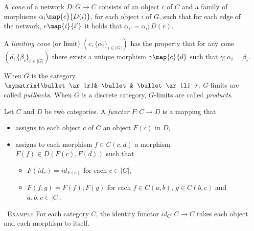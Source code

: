 \documentclass[10pt, a4paper]{isov2}
\renewenvironment{example}[0]{\ \newline \textsc{Example}\quad }{}
\begin{document}
\begin{definition}
A \emph{cone} of
a network $D:G\to C$ consists of an object $c$ of $C$ and a family of
morphisms $\alpha_i\map{c}{D(i)}$, for each object $i$ of $G$, such that for
each edge of the network, $e\map{i}{i'}$  it holds that 
$\alpha_{i'} = \alpha_{i};D(e)$. 
\end{definition} 

\begin{definition}
A \emph{limiting cone} (or limit) $(c, \{\alpha_i\}_{i\in|G|})$ 
has the property that for any 
cone $(d, \{\beta_i\}_{i\in |G|})$ there exists a unique morphism 
$\gamma\map{c}{d}$ such that $\gamma;\alpha_i = \beta_i$.
 \end{definition}

 When $G$ is the category $\xymatrix{\bullet \ar[r]& \bullet & \bullet \ar[l] }$, $G$-limits are
called  \emph{pullbacks}.
 When $G$ is a discrete category,
 $G$-limits are called \emph{products}.



\begin{definition}
Let $C$ and $D$ be two categories. A \emph{functor} $F: C \to D $ is a mapping that 
 \begin{itemize} 
  \item assigns to each object $c$ of $C$ an object $F(c)$ in $D$,
  \item assigns to each morphism $f\in C(c,d)$ a morphism $F(f)\in D(F(c), F(d))$ such that 
    \begin{itemize} 
     \item $F(\mathit{id}_c) = \mathit{id}_{F(c)} $ for each $c\in |C|$,
     \item $F(f;g) = F(f);F(g)$ for each $f\in C(a,b)$, $g\in C(b,c)$ and $a,b,c \in |C|$.
    \end{itemize} 
 \end{itemize} 
\end{definition}

\begin{example}
For each category $C$, the identity functor $\mathit{id}_C : C \to C$ takes 
each object and each morphism to itself. 
\end{example}
\end{document}
